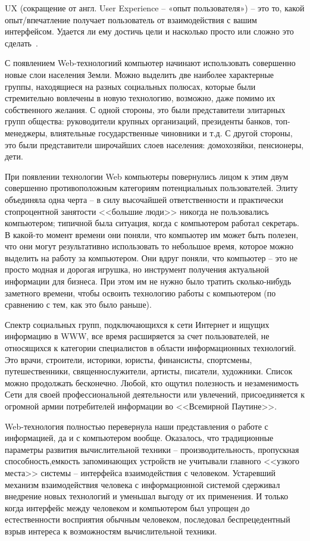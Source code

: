 UX (сокращение от англ. User Experience -- «опыт пользователя») -- это то, какой опыт/впечатление получает пользователь от взаимодействия с вашим интерфейсом. Удается ли ему достичь цели и насколько просто или сложно это сделать~\cite{habr_ux}.

\label{sec:introduction}

С появлением Web-технологиий компьютер начинают использовать совершенно новые слои населения Земли. Можно выделить две наиболее характерные группы, находящиеся на разных социальных полюсах, которые были стремительно вовлечены в новую технологию, возможно, даже помимо их собственного желания. С одной стороны, это были представители элитарных групп общества: руководители крупных организаций, президенты банков, топ- менеджеры, влиятельные государственные чиновники и т.д. С другой стороны, это были представители широчайших слоев населения: домохозяйки, пенсионеры, дети.

При появлении технологии Web компьютеры повернулись лицом к этим двум совершенно противоположным категориям потенциальных пользователей. Элиту объединяла одна черта – в силу высочайшей ответственности и практически стопроцентной занятости <<большие люди>> никогда не пользовались компьютером; типичной была ситуация, когда с компьютером работал секретарь. В какой-то момент времени они поняли, что компьютер им может быть полезен, что они могут результативно использовать то небольшое время, которое можно выделить на работу за компьютером. Они вдруг поняли, что компьютер -- это не просто модная и дорогая игрушка, но инструмент получения актуальной информации для бизнеса. При этом им не нужно было тратить сколько-нибудь заметного времени, чтобы освоить технологию работы с компьютером (по сравнению с тем, как это было раньше).

Спектр социальных групп, подключающихся к сети Интернет и ищущих информацию в WWW, все время расширяется за счет пользователей, не относящихся к категории специалистов в области информационных технологий. Это врачи, строители, историки, юристы, финансисты, спортсмены, путешественники, священнослужители, артисты, писатели, художники. Список можно продолжать бесконечно. Любой, кто ощутил полезность и незаменимость Сети для своей профессиональной деятельности или увлечений, присоединяется к огромной армии потребителей информации во <<Всемирной Паутине>>.

Web-технология полностью перевернула наши представления о работе с информацией, да и с компьютером вообще. Оказалось, что традиционные параметры развития вычислительной техники -- производительность, пропускная способность,емкость запоминающих устройств не учитывали главного <<узкого места>> системы -- интерфейса взаимодействия с человеком. Устаревший механизм взаимодействия человека с информационной системой сдерживал внедрение новых технологий и уменьшал выгоду от их применения. И только когда интерфейс между человеком и компьютером был упрощен до естественности восприятия обычным человеком, последовал беспрецедентный взрыв интереса к возможностям вычислительной техники.

